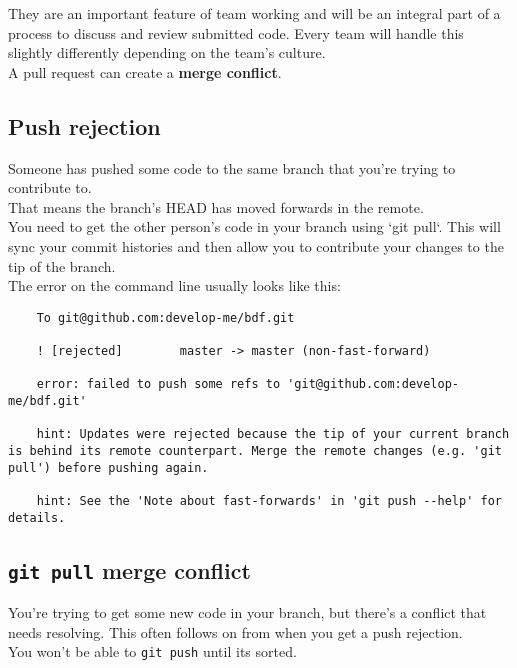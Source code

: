 They are an important feature of team working and will be an integral part of a process to discuss and review submitted code. Every team will handle this slightly differently depending on the team's culture.
\\

A pull request can create a \textbf{merge conflict}.


\subsection{Push rejection}

Someone has pushed some code to the same branch that you’re trying to contribute to.
\\

That means the branch’s HEAD has moved forwards in the remote.
\\

You need to get the other person's code in your branch using `git pull`. This will sync your commit histories and then allow you to contribute your changes to the tip of the branch.
\\

The error on the command line usually looks like this:

\begin{verbatim}
    To git@github.com:develop-me/bdf.git

    ! [rejected]        master -> master (non-fast-forward)

    error: failed to push some refs to 'git@github.com:develop-me/bdf.git'

    hint: Updates were rejected because the tip of your current branch is behind its remote counterpart. Merge the remote changes (e.g. 'git pull') before pushing again.

    hint: See the 'Note about fast-forwards' in 'git push --help' for details.
\end{verbatim}


\subsection{ \texttt{git pull} merge conflict}

You’re trying to get some new code in your branch, but there’s a conflict that needs resolving. This often follows on from when you get a push rejection.
\\

You won’t be able to \texttt{git push} until its sorted.
\\


